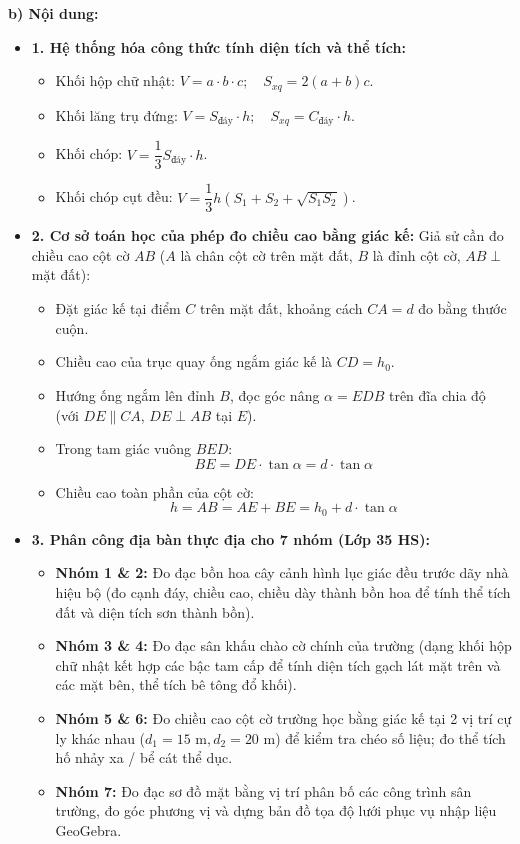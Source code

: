 \documentclass[12pt, a4paper]{article}
\begin{document}
\noindent \textbf{b) Nội dung:}
\begin{itemize}[leftmargin=0.6cm]
    \item \textbf{1. Hệ thống hóa công thức tính diện tích và thể tích:}
    \begin{itemize}
        \item Khối hộp chữ nhật: $V = a \cdot b \cdot c; \quad S_{xq} = 2(a + b)c$.
        \item Khối lăng trụ đứng: $V = S_{\text{đáy}} \cdot h; \quad S_{xq} = C_{\text{đáy}} \cdot h$.
        \item Khối chóp: $V = \dfrac{1}{3} S_{\text{đáy}} \cdot h$.
        \item Khối chóp cụt đều: $V = \dfrac{1}{3} h \left(S_1 + S_2 + \sqrt{S_1 S_2}\right)$.
    \end{itemize}
    \item \textbf{2. Cơ sở toán học của phép đo chiều cao bằng giác kế:}
    Giả sử cần đo chiều cao cột cờ $AB$ ($A$ là chân cột cờ trên mặt đất, $B$ là đỉnh cột cờ, $AB \perp$ mặt đất):
    \begin{itemize}
        \item Đặt giác kế tại điểm $C$ trên mặt đất, khoảng cách $CA = d$ đo bằng thước cuộn.
        \item Chiều cao của trục quay ống ngắm giác kế là $CD = h_0$.
        \item Hướng ống ngắm lên đỉnh $B$, đọc góc nâng $\alpha = \widehat{EDB}$ trên đĩa chia độ (với $D E \parallel C A$, $D E \perp A B$ tại $E$).
        \item Trong tam giác vuông $B E D$:
        $$B E = D E \cdot \tan\alpha = d \cdot \tan\alpha$$
        \item Chiều cao toàn phần của cột cờ:
        $$h = A B = A E + B E = h_0 + d \cdot \tan\alpha$$
    \end{itemize}
    \item \textbf{3. Phân công địa bàn thực địa cho 7 nhóm (Lớp 35 HS):}
    \begin{itemize}
        \item \textbf{Nhóm 1 \& 2:} Đo đạc bồn hoa cây cảnh hình lục giác đều trước dãy nhà hiệu bộ (đo cạnh đáy, chiều cao, chiều dày thành bồn hoa để tính thể tích đất và diện tích sơn thành bồn).
        \item \textbf{Nhóm 3 \& 4:} Đo đạc sân khấu chào cờ chính của trường (dạng khối hộp chữ nhật kết hợp các bậc tam cấp để tính diện tích gạch lát mặt trên và các mặt bên, thể tích bê tông đổ khối).
        \item \textbf{Nhóm 5 \& 6:} Đo chiều cao cột cờ trường học bằng giác kế tại 2 vị trí cự ly khác nhau ($d_1 = 15\text{ m}, d_2 = 20\text{ m}$) để kiểm tra chéo số liệu; đo thể tích hố nhảy xa / bể cát thể dục.
        \item \textbf{Nhóm 7:} Đo đạc sơ đồ mặt bằng vị trí phân bố các công trình sân trường, đo góc phương vị và dựng bản đồ tọa độ lưới phục vụ nhập liệu GeoGebra.
    \end{itemize}
\end{itemize}
\end{document}
